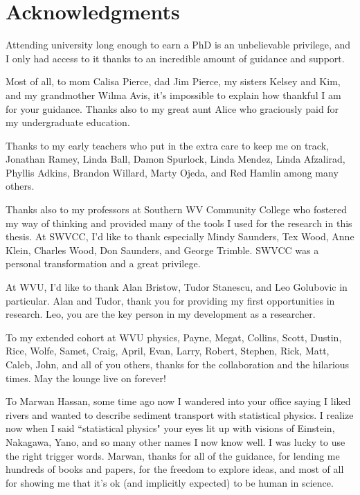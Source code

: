 
\chapter{Acknowledgments}

Attending university long enough to earn a PhD is an unbelievable privilege, and I only had access to it thanks to an incredible amount of guidance and support.

Most of all, to mom Calisa Pierce, dad Jim Pierce, my sisters Kelsey and Kim, and my grandmother Wilma Avis, it's impossible to explain how thankful I am for your guidance. Thanks also to my great aunt Alice who graciously paid for my undergraduate education.

Thanks to my early teachers who put in the extra care to keep me on track, Jonathan Ramey, Linda Ball, Damon Spurlock, Linda Mendez, Linda Afzalirad, Phyllis Adkins, Brandon Willard, Marty Ojeda, and Red Hamlin among many others.
	
Thanks also to my professors at Southern WV Community College who fostered my way of thinking and provided many of the tools I used for the research in this thesis.
At SWVCC, I'd like to thank especially Mindy Saunders, Tex Wood, Anne Klein, Charles Wood, Don Saunders, and George Trimble. SWVCC was a personal transformation and a great privilege. 

At WVU, I'd like to thank Alan Bristow, Tudor Stanescu, and Leo Golubovic in particular. Alan and Tudor, thank you for providing my first opportunities in research. Leo, you are the key person in my development as a researcher.

To my extended cohort at WVU physics, Payne, Megat, Collins, Scott, Dustin, Rice, Wolfe, Samet, Craig, April, Evan, Larry, Robert, Stephen, Rick, Matt, Caleb, John, and all of you others, thanks for the collaboration and the hilarious times. May the lounge live on forever!

To Marwan Hassan, some time ago now I wandered into your office saying I liked rivers and wanted to describe sediment transport with statistical physics. I realize now when I said ``statistical physics" your eyes lit up with visions of Einstein, Nakagawa, Yano, and so many other names I now know well. I was lucky to use the right trigger words.
Marwan, thanks for all of the guidance, for lending me hundreds of books and papers, for the freedom to explore ideas, and most of all for showing me that it's ok (and implicitly expected) to be human in science. 

